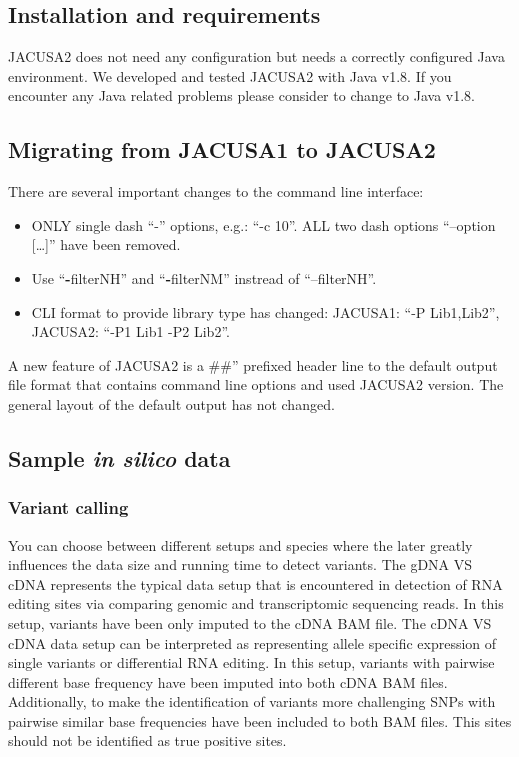 \documentclass[10pt,a4paper]{article}
\begin{document}
\subsection{Installation and requirements}
JACUSA2 does not need any configuration but needs a correctly configured Java environment.
We developed and tested JACUSA2 with Java v1.8. If you encounter any Java related problems please
consider to change to Java v1.8.
\subsection{Migrating from JACUSA1 to JACUSA2}
There are several important changes to the command line interface:
\begin{itemize}
  \item ONLY single dash ``-'' options, e.g.: ``-c 10''. ALL two dash options ``--option [\ldots]'' have been removed.
  \item Use ``\textbf{-}filterNH'' and ``\textbf{-}filterNM'' instread of ``--filterNH''. 
	\item CLI format to provide library type has changed: JACUSA1: ``-P Lib1,Lib2'', JACUSA2: ``-P1 Lib1 -P2 Lib2''.
\end{itemize}
A new feature of JACUSA2 is a \#\#'' prefixed header line to the default output file format that 
contains command line options and used JACUSA2 version. The general layout of the default output has not changed.
\subsection{Sample \textit{in silico} data}
\subsubsection{Variant calling}
You can choose between different setups and species where the later greatly influences the data size 
and running time to detect variants. The gDNA VS cDNA represents the typical data setup that is 
encountered in detection of RNA editing sites via comparing genomic and transcriptomic sequencing reads. 
In this setup, variants have been only imputed to the cDNA BAM file. The cDNA VS cDNA data setup can be interpreted as
representing allele specific expression of single variants or differential RNA editing. In this
setup, variants with pairwise different base frequency have been imputed into both cDNA BAM files.
Additionally, to make the identification of variants more challenging SNPs with pairwise similar base
frequencies have been included to both BAM files. This sites should not be identified as true
positive sites.
\end{document}
